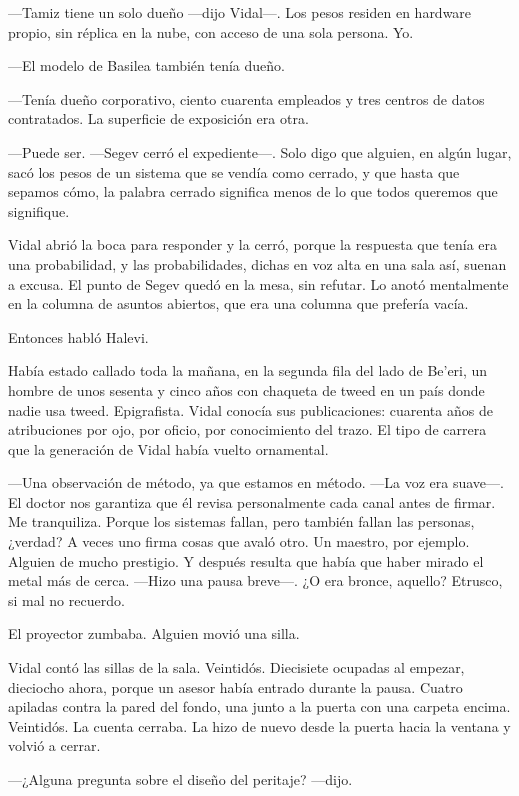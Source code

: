 ---Tamiz tiene un solo dueño ---dijo Vidal---. Los pesos residen en hardware propio, sin réplica en la nube, con acceso de una sola persona. Yo.

---El modelo de Basilea también tenía dueño.

---Tenía dueño corporativo, ciento cuarenta empleados y tres centros de datos contratados. La superficie de exposición era otra.

---Puede ser. ---Segev cerró el expediente---. Solo digo que alguien, en algún lugar, sacó los pesos de un sistema que se vendía como cerrado, y que hasta que sepamos cómo, la palabra cerrado significa menos de lo que todos queremos que signifique.

Vidal abrió la boca para responder y la cerró, porque la respuesta que tenía era una probabilidad, y las probabilidades, dichas en voz alta en una sala así, suenan a excusa. El punto de Segev quedó en la mesa, sin refutar. Lo anotó mentalmente en la columna de asuntos abiertos, que era una columna que prefería vacía.

Entonces habló Halevi.

Había estado callado toda la mañana, en la segunda fila del lado de Be'eri, un hombre de unos sesenta y cinco años con chaqueta de tweed en un país donde nadie usa tweed. Epigrafista. Vidal conocía sus publicaciones: cuarenta años de atribuciones por ojo, por oficio, por conocimiento del trazo. El tipo de carrera que la generación de Vidal había vuelto ornamental.

---Una observación de método, ya que estamos en método. ---La voz era suave---. El doctor nos garantiza que él revisa personalmente cada canal antes de firmar. Me tranquiliza. Porque los sistemas fallan, pero también fallan las personas, ¿verdad? A veces uno firma cosas que avaló otro. Un maestro, por ejemplo. Alguien de mucho prestigio. Y después resulta que había que haber mirado el metal más de cerca. ---Hizo una pausa breve---. ¿O era bronce, aquello? Etrusco, si mal no recuerdo.

El proyector zumbaba. Alguien movió una silla.

Vidal contó las sillas de la sala. Veintidós. Diecisiete ocupadas al empezar, dieciocho ahora, porque un asesor había entrado durante la pausa. Cuatro apiladas contra la pared del fondo, una junto a la puerta con una carpeta encima. Veintidós. La cuenta cerraba. La hizo de nuevo desde la puerta hacia la ventana y volvió a cerrar.

---¿Alguna pregunta sobre el diseño del peritaje? ---dijo.

